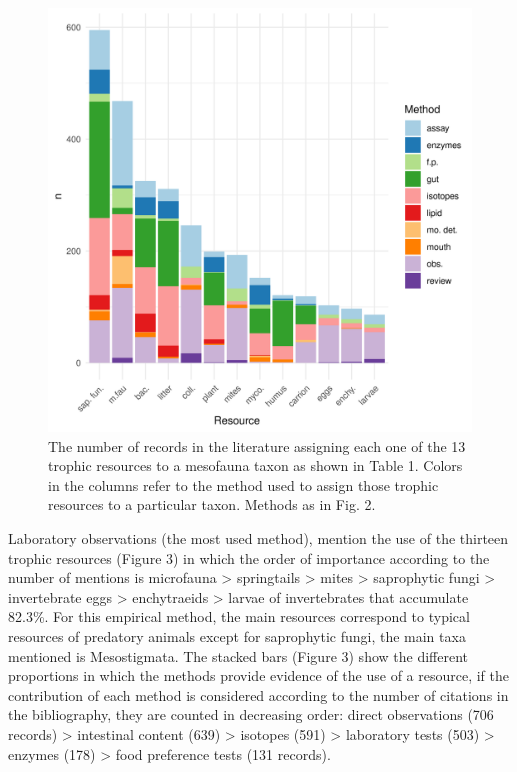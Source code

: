 \documentclass[10pt,oneside]{article}
\makeatletter
\def\maxwidth{\ifdim\Gin@nat@width>\linewidth\linewidth
\else\Gin@nat@width\fi}
\let\Oldincludegraphics\includegraphics
\renewcommand{\includegraphics}[1]{\Oldincludegraphics[width=\maxwidth]{#1}}
\makeatother
\begin{document}
\begin{figure}
\centering
\includegraphics{figures/Recursos_ByMetodo.png}
\caption{The number of records in the literature assigning each one of
the 13 trophic resources to a mesofauna taxon as shown in Table 1.
Colors in the columns refer to the method used to assign those trophic
resources to a particular taxon. Methods as in Fig. 2.}
\end{figure}

Laboratory observations (the most used method), mention the use of the
thirteen trophic resources (Figure 3) in which the order of importance
according to the number of mentions is microfauna \textgreater{}
springtails \textgreater{} mites \textgreater{} saprophytic fungi
\textgreater{} invertebrate eggs \textgreater{} enchytraeids
\textgreater{} larvae of invertebrates that accumulate 82.3\%. For this
empirical method, the main resources correspond to typical resources of
predatory animals except for saprophytic fungi, the main taxa mentioned
is Mesostigmata. The stacked bars (Figure 3) show the different
proportions in which the methods provide evidence of the use of a
resource, if the contribution of each method is considered according to
the number of citations in the bibliography, they are counted in
decreasing order: direct observations (706 records) \textgreater{}
intestinal content (639) \textgreater{} isotopes (591) \textgreater{}
laboratory tests (503) \textgreater{} enzymes (178) \textgreater{} food
preference tests (131 records).
\end{document}
